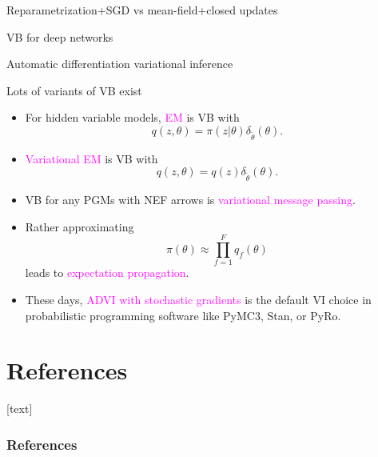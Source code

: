 \documentclass[10pt]{beamer}
\newcommand\un[1]{\textcolor{magenta}{#1}}
\def\blank{\vspace{.5\textheight}}
\begin{document}
\begin{frame}{Reparametrization+SGD vs mean-field+closed updates}
  \vfill
  \blank
\end{frame}

\begin{frame}{VB for deep networks}
  \vfill
  \blank
\end{frame}

\begin{frame}{Automatic differentiation variational inference  \citep{KTRGB17}}
  \vfill
  \blank
  \end{frame}

\begin{frame}{Lots of variants of VB exist \citep{Mur12}}
  \begin{itemize}
    \item For hidden variable models, \un{EM} is VB with $$q(z,\theta) = \pi(z\vert \theta)\delta_{\tilde\theta}(\theta).$$
    \item \un{Variational EM} is VB with $$q(z,\theta) = q(z)\delta_{\tilde\theta}(\theta).$$
    \item VB for any PGMs with NEF arrows is \un{variational message passing}.
    \item Rather approximating $$\pi(\theta) \approx \prod_{f=1}^F q_f(\theta)$$ leads to \un{expectation propagation}.
    \item These days, \un{ADVI with stochastic gradients} is the default VI choice in probabilistic programming software like PyMC3, Stan, or PyRo.
  \end{itemize}
\end{frame}

\section*{References}
[text]%
\begin{frame}[allowframebreaks]
\frametitle{References}
\small
\printbibliography
\normalsize
\end{frame}
\end{document}
